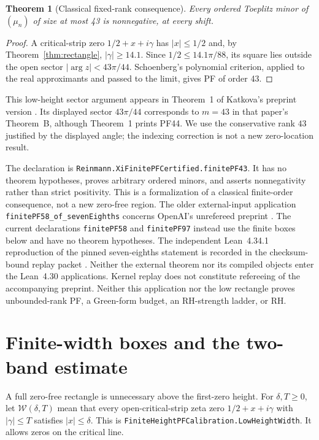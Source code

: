 \documentclass[11pt]{amsart}
\newtheorem{theorem}{Theorem}[section]
\begin{document}
\begin{theorem}[Classical fixed-rank consequence]\label{thm:pf43}
Every ordered Toeplitz minor of $(\mu_n)$ of size at most 43 is nonnegative,
at every shift.
\end{theorem}
\begin{proof}
A critical-strip zero $1/2+x+i\gamma$ has $|x|\le1/2$ and, by
Theorem~\ref{thm:rectangle}, $|\gamma|\ge14.1$. Since
$1/2\le14.1\pi/88$, its square lies outside the open sector
$|\arg z|<43\pi/44$. Schoenberg's polynomial criterion, applied to the
real approximants and passed to the limit, gives PF of order 43.
\end{proof}
This low-height sector argument appears in Theorem~1 of Katkova's
preprint version \cite{katkova}. Its displayed sector $43\pi/44$ corresponds to
$m=43$ in that paper's Theorem~B, although Theorem~1 prints PF44. We use the
conservative rank $43$ justified by the displayed angle; the indexing
correction is not a new zero-location result.

The declaration is \texttt{Reinmann.XiFinitePFCertified.finitePF43}.
It has no theorem hypotheses, proves arbitrary ordered minors, and asserts
nonnegativity rather than strict positivity. This is a formalization of a
classical finite-order consequence, not a new zero-free region. The older
external-input application \texttt{finitePF58\_of\_sevenEighths} concerns
OpenAI's unrefereed preprint \cite{openai78}. The current declarations
\texttt{finitePF58} and \texttt{finitePF97} instead use the finite boxes below
and have no theorem hypotheses. The independent Lean~4.34.1 reproduction of
the pinned seven-eighths statement is recorded in the checksum-bound replay
packet \cite{sevenreplay}. Neither the external theorem nor its compiled
objects enter the Lean~4.30 applications. Kernel replay does not constitute
refereeing of the accompanying preprint.
Neither this application nor the low rectangle proves unbounded-rank PF,
a Green-form budget, an RH-strength ladder, or RH.


\section{Finite-width boxes and the two-band estimate}\label{sec:finitebands}
A full zero-free rectangle is unnecessary above the first-zero height.
For $\delta,T\ge0$, let $\mathcal W(\delta,T)$ mean that every open-critical-strip
zeta zero $1/2+x+i\gamma$ with $|\gamma|\le T$ satisfies $|x|\le\delta$.
This is \texttt{FiniteHeightPFCalibration.LowHeightWidth}.
It allows zeros on the critical line.
\end{document}
